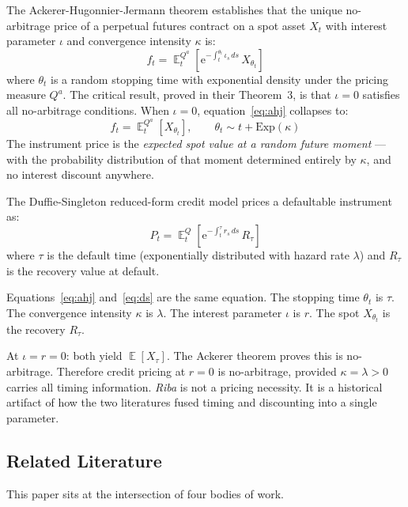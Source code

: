 \documentclass[10pt,twocolumn]{article}
\theoremstyle{plain}
\theoremstyle{definition}
\DeclareMathOperator{\E}{\mathbb{E}}
\newcommand{\Qa}{Q^a}
\begin{document}
The Ackerer-Hugonnier-Jermann theorem establishes that the unique
no-arbitrage price of a perpetual futures contract on a spot asset $X_t$
with interest parameter $\iota$ and convergence intensity $\kappa$ is:
\begin{equation}
f_t = \E^{\Qa}_t\!\left[\mathrm{e}^{-\int_t^{\theta_t}\!\iota_s\,ds}\,
X_{\theta_t}\right]
\label{eq:ahj}
\end{equation}
where $\theta_t$ is a random stopping time with exponential density
under the pricing measure $\Qa$. The critical result, proved in their
Theorem~3, is that $\iota = 0$ satisfies all no-arbitrage conditions.
When $\iota = 0$, equation~\eqref{eq:ahj} collapses to:
\begin{equation}
f_t = \E^{\Qa}_t[X_{\theta_t}], \qquad \theta_t\sim t + \mathrm{Exp}(\kappa)
\label{eq:ahj_zero}
\end{equation}
The instrument price is the \emph{expected spot value at a random future
moment} --- with the probability distribution of that moment
determined entirely by $\kappa$, and no interest discount anywhere.

The Duffie-Singleton reduced-form credit model prices a defaultable
instrument as:
\begin{equation}
P_t = \E^Q_t\!\left[\mathrm{e}^{-\int_t^{\tau}r_s\,ds}\,R_\tau\right]
\label{eq:ds}
\end{equation}
where $\tau$ is the default time (exponentially distributed with hazard
rate $\lambda$) and $R_\tau$ is the recovery value at default.

Equations~\eqref{eq:ahj} and~\eqref{eq:ds} are the same equation.
The stopping time $\theta_t$ is $\tau$. The convergence intensity
$\kappa$ is $\lambda$. The interest parameter $\iota$ is $r$.
The spot $X_{\theta_t}$ is the recovery $R_\tau$.

At $\iota = r = 0$: both yield $\E[X_\tau]$. The Ackerer theorem
proves this is no-arbitrage. Therefore credit pricing at $r = 0$ is
no-arbitrage, provided $\kappa = \lambda > 0$ carries all timing
information. \textit{Riba} is not a pricing necessity. It is a
historical artifact of how the two literatures fused timing and
discounting into a single parameter.

\subsection*{Related Literature}
\label{sec:lit}

This paper sits at the intersection of four bodies of work.
\end{document}
